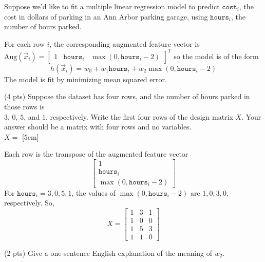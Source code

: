 \documentclass[11pt]{article}
\begin{document}
\begin{prob}
Suppose we'd like to fit a multiple linear regression model to predict $\texttt{cost}_i$, the cost in dollars of parking in an Ann Arbor parking garage, using $\texttt{hours}_i$, the number of hours parked.

For each row $i$, the corresponding augmented feature vector is $\text{Aug}(\vec x_i) = \begin{bmatrix} 1 & \texttt{hours}_i & \max(0,\texttt{hours}_i-2) \end{bmatrix}^T$
so the model is of the form
\[
h(\vec x_i)
=
w_0 + w_1 \texttt{hours}_i + w_2 \max(0, \texttt{hours}_i - 2)
\]
The model is fit by minimizing mean squared error.

\begin{subprob}(4 pts) Suppose the dataset has four rows, and the number of hours parked in those rows is \\
$3$, $0$, $5$, and $1$, respectively. Write the first four rows of the design matrix $X$. Your answer should be a matrix with four rows and no variables. \\

$X =$ [5cm]
\begin{solution}
Each row is the transpose of the augmented feature vector
\[
\begin{bmatrix}
1\\
\texttt{hours}_i\\
\max(0,\texttt{hours}_i-2)
\end{bmatrix}
\]
For $\texttt{hours}_i=3,0,5,1$, the values of $\max(0,\texttt{hours}_i-2)$ are $1,0,3,0$, respectively. So,
\[
X=
\begin{bmatrix}
1&3&1\\
1&0&0\\
1&5&3\\
1&1&0
\end{bmatrix}
\]
\end{solution}
\end{subprob}

\begin{subprob}(2 pts) Give a one-sentence English explanation of the meaning of $w_2$. \\


\end{subprob}
\end{prob}
\end{document}
